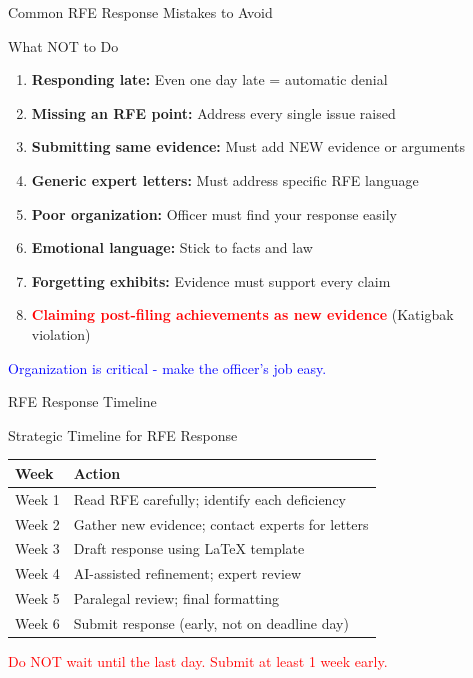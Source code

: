 \documentclass[11pt]{beamer}
\begin{document}
	\begin{frame}{Common RFE Response Mistakes to Avoid}
		\scriptsize
		\begin{block}{What NOT to Do}
			\begin{enumerate}
				\item \textbf{Responding late:} Even one day late = automatic denial
				\item \textbf{Missing an RFE point:} Address every single issue raised
				\item \textbf{Submitting same evidence:} Must add NEW evidence or arguments
				\item \textbf{Generic expert letters:} Must address specific RFE language
				\item \textbf{Poor organization:} Officer must find your response easily
				\item \textbf{Emotional language:} Stick to facts and law
				\item \textbf{Forgetting exhibits:} Evidence must support every claim
				\item \textbf{\textcolor{red}{Claiming post-filing achievements as new evidence}} (Katigbak violation)
			\end{enumerate}
			\textcolor{blue}{Organization is critical - make the officer's job easy.}
		\end{block}
	\end{frame}
	
	\begin{frame}{RFE Response Timeline}
		\scriptsize
		\begin{block}{Strategic Timeline for RFE Response}
			\begin{tabular}{|p{3cm}|p{6cm}|}
				\hline
				\textbf{Week} & \textbf{Action} \\
				\hline
				Week 1 & Read RFE carefully; identify each deficiency \\
				\hline
				Week 2 & Gather new evidence; contact experts for letters \\
				\hline
				Week 3 & Draft response using LaTeX template \\
				\hline
				Week 4 & AI-assisted refinement; expert review \\
				\hline
				Week 5 & Paralegal review; final formatting \\
				\hline
				Week 6 & Submit response (early, not on deadline day) \\
				\hline
			\end{tabular}
			\vspace{0.2cm}
			\textcolor{red}{Do NOT wait until the last day. Submit at least 1 week early.}
		\end{block}
	\end{frame}
	
\end{document}
